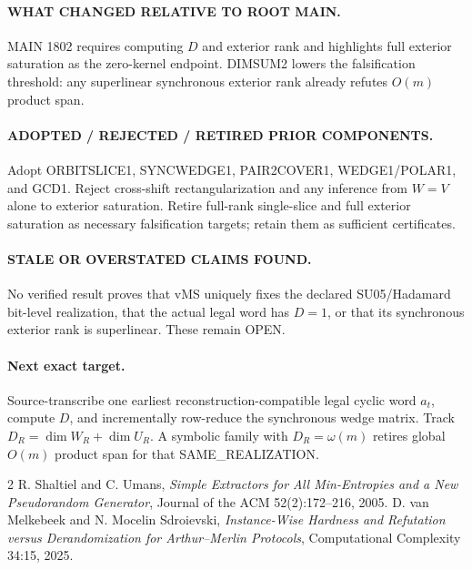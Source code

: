 \documentclass[11pt]{article}
\begin{document}
\paragraph{WHAT CHANGED RELATIVE TO ROOT MAIN.}
MAIN 1802 requires computing \(D\) and exterior rank and highlights full exterior saturation as the zero-kernel endpoint. DIMSUM2 lowers the falsification threshold: any superlinear synchronous exterior rank already refutes \(O(m)\) product span.

\paragraph{ADOPTED / REJECTED / RETIRED PRIOR COMPONENTS.}
Adopt ORBITSLICE1, SYNCWEDGE1, PAIR2COVER1, WEDGE1/POLAR1, and GCD1. Reject cross-shift rectangularization and any inference from \(W=V\) alone to exterior saturation. Retire full-rank single-slice and full exterior saturation as necessary falsification targets; retain them as sufficient certificates.

\paragraph{STALE OR OVERSTATED CLAIMS FOUND.}
No verified result proves that vMS uniquely fixes the declared SU05/Hadamard bit-level realization, that the actual legal word has \(D=1\), or that its synchronous exterior rank is superlinear. These remain OPEN.

\paragraph{Next exact target.}
Source-transcribe one earliest reconstruction-compatible legal cyclic word \(a_t\), compute \(D\), and incrementally row-reduce the synchronous wedge matrix. Track \(D_R=\dim W_R+\dim U_R\). A symbolic family with \(D_R=\omega(m)\) retires global \(O(m)\) product span for that SAME\_REALIZATION.

\begin{thebibliography}{2}
 R. Shaltiel and C. Umans, \emph{Simple Extractors for All Min-Entropies and a New Pseudorandom Generator}, Journal of the ACM 52(2):172--216, 2005.
 D. van Melkebeek and N. Mocelin Sdroievski, \emph{Instance-Wise Hardness and Refutation versus Derandomization for Arthur--Merlin Protocols}, Computational Complexity 34:15, 2025.
\end{thebibliography}
\end{document}
